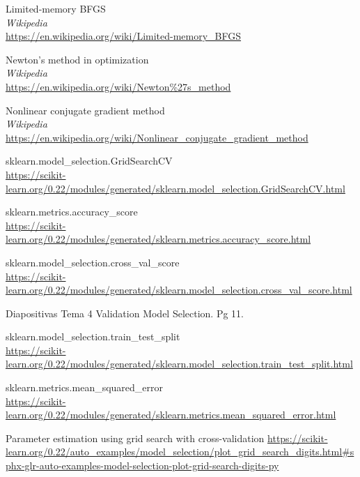 \begin{thebibliography}{9}
Limited-memory BFGS
\\\textit{Wikipedia}
\\\url{https://en.wikipedia.org/wiki/Limited-memory\_BFGS}

Newton's method in optimization
\\\textit{Wikipedia}
\\\url{https://en.wikipedia.org/wiki/Newton\%27s\_method}

Nonlinear conjugate gradient method
\\\textit{Wikipedia}
\\\url{https://en.wikipedia.org/wiki/Nonlinear\_conjugate\_gradient\_method}

sklearn.model\_selection.GridSearchCV
\\\url{https://scikit-learn.org/0.22/modules/generated/sklearn.model\_selection.GridSearchCV.html}

sklearn.metrics.accuracy\_score
\\\url{https://scikit-learn.org/0.22/modules/generated/sklearn.metrics.accuracy\_score.html}

sklearn.model\_selection.cross\_val\_score
\\\url{https://scikit-learn.org/0.22/modules/generated/sklearn.model\_selection.cross\_val\_score.html}

Diapositivas Tema 4 Validation Model Selection. Pg 11.

sklearn.model\_selection.train\_test\_split
\\\url{https://scikit-learn.org/0.22/modules/generated/sklearn.model\_selection.train\_test\_split.html}

sklearn.metrics.mean\_squared\_error
\\\url{https://scikit-learn.org/0.22/modules/generated/sklearn.metrics.mean\_squared\_error.html}

Parameter estimation using grid search with cross-validation
\url{https://scikit-learn.org/0.22/auto\_examples/model\_selection/plot\_grid\_search\_digits.html#sphx-glr-auto-examples-model-selection-plot-grid-search-digits-py}


\end{thebibliography}
